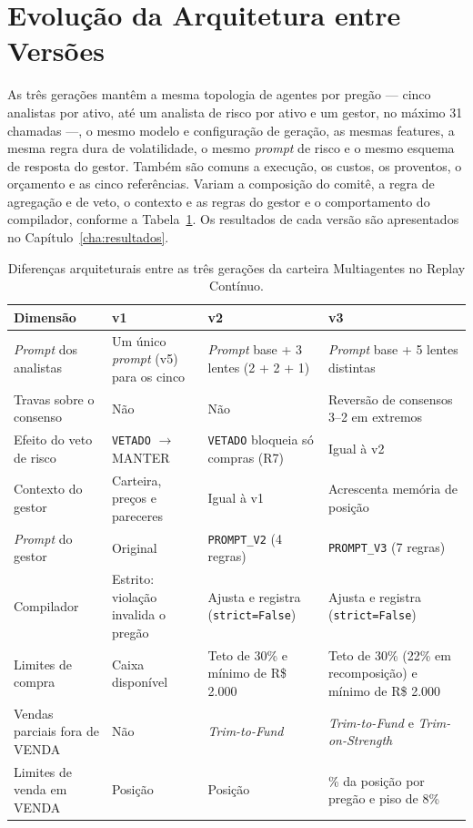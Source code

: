 \documentclass{eic-bcc-tcc}
\begin{document}
\section{Evolução da Arquitetura entre Versões}
\label{sec:arq-evolucao}

As três gerações mantêm a mesma topologia de agentes por pregão --- cinco analistas por ativo, até um analista de risco por ativo e um gestor, no máximo 31 chamadas ---, o mesmo modelo e configuração de geração, as mesmas features, a mesma regra dura de volatilidade, o mesmo \textit{prompt} de risco e o mesmo esquema de resposta do gestor. Também são comuns a execução, os custos, os proventos, o orçamento e as cinco referências. Variam a composição do comitê, a regra de agregação e de veto, o contexto e as regras do gestor e o comportamento do compilador, conforme a Tabela~\ref{tab:evolucao-versoes}. Os resultados de cada versão são apresentados no Capítulo~\ref{cha:resultados}.

\begin{table}[htbp]
\centering
\caption{Diferenças arquiteturais entre as três gerações da carteira Multiagentes no Replay Contínuo.}
\label{tab:evolucao-versoes}
\small
\setlength{\tabcolsep}{4pt}
\begin{tabular}{>{\raggedright\arraybackslash}p{3.0cm} >{\raggedright\arraybackslash}p{3.8cm} >{\raggedright\arraybackslash}p{3.8cm} >{\raggedright\arraybackslash}p{4.0cm}}
\toprule
\textbf{Dimensão} & \textbf{v1} & \textbf{v2} & \textbf{v3} \\
\midrule
\textit{Prompt} dos analistas & Um único \textit{prompt} (v5) para os cinco & \textit{Prompt} base + 3 lentes (2 + 2 + 1) & \textit{Prompt} base + 5 lentes distintas \\
Travas sobre o consenso & Não & Não & Reversão de consensos 3--2 em extremos \\
Efeito do veto de risco & \texttt{VETADO} $\rightarrow$ MANTER & \texttt{VETADO} bloqueia só compras (R7) & Igual à v2 \\
Contexto do gestor & Carteira, preços e pareceres & Igual à v1 & Acrescenta memória de posição \\
\textit{Prompt} do gestor & Original & \texttt{PROMPT\_V2} (4 regras) & \texttt{PROMPT\_V3} (7 regras) \\
Compilador & Estrito: violação invalida o pregão & Ajusta e registra (\texttt{strict=False}) & Ajusta e registra (\texttt{strict=False}) \\
Limites de compra & Caixa disponível & Teto de 30\% e mínimo de R\$ 2.000 & Teto de 30\% (22\% em recomposição) e mínimo de R\$ 2.000 \\
Vendas parciais fora de VENDA & Não & \textit{Trim-to-Fund} & \textit{Trim-to-Fund} e \textit{Trim-on-Strength} \\
Limites de venda em VENDA & Posição & Posição & 45\% da posição por pregão e piso de 8\% \\
\bottomrule
\end{tabular}
\end{table}
\end{document}

